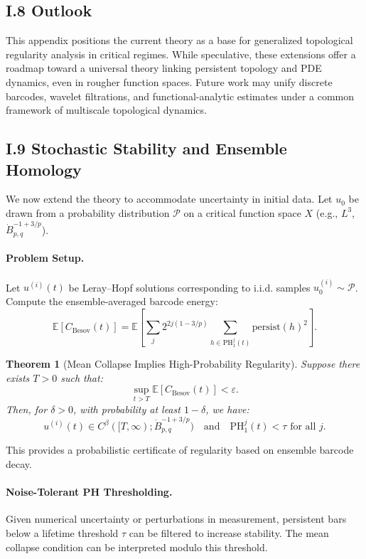 \documentclass[11pt]{article}
\newtheorem{theorem}{Theorem}[section]
\theoremstyle{definition}
\begin{document}
\subsection*{I.8 Outlook}

This appendix positions the current theory as a base for generalized topological regularity analysis in critical regimes. While speculative, these extensions offer a roadmap toward a universal theory linking persistent topology and PDE dynamics, even in rougher function spaces. Future work may unify discrete barcodes, wavelet filtrations, and functional-analytic estimates under a common framework of multiscale topological dynamics.

\subsection*{I.9 Stochastic Stability and Ensemble Homology}

We now extend the theory to accommodate uncertainty in initial data. Let $u_0$ be drawn from a probability distribution $\mathcal{P}$ on a critical function space $X$ (e.g., $L^3$, $\dot{B}^{-1+3/p}_{p,q}$).

\paragraph{Problem Setup.} Let $u^{(i)}(t)$ be Leray--Hopf solutions corresponding to i.i.d. samples $u^{(i)}_0 \sim \mathcal{P}$. Compute the ensemble-averaged barcode energy:
\[ \mathbb{E}[C_{\text{Besov}}(t)] = \mathbb{E}\left[\sum_{j} 2^{2j(1 - 3/p)} \sum_{h \in \mathrm{PH}_1^j(t)} \mathrm{persist}(h)^2\right]. \]

\begin{theorem}[Mean Collapse Implies High-Probability Regularity]
Suppose there exists $T > 0$ such that:
\[ \sup_{t > T} \mathbb{E}[C_{\text{Besov}}(t)] < \varepsilon. \]
Then, for $\delta > 0$, with probability at least $1 - \delta$, we have:
\[ u^{(i)}(t) \in C^\beta([T, \infty); \dot{B}^{-1+3/p}_{p,q}) \quad \text{and} \quad \mathrm{PH}_1^j(t) < \tau \text{ for all } j. \]
\end{theorem}

This provides a probabilistic certificate of regularity based on ensemble barcode decay.

\paragraph{Noise-Tolerant PH Thresholding.} Given numerical uncertainty or perturbations in measurement, persistent bars below a lifetime threshold $\tau$ can be filtered to increase stability. The mean collapse condition can be interpreted modulo this threshold.
\end{document}
